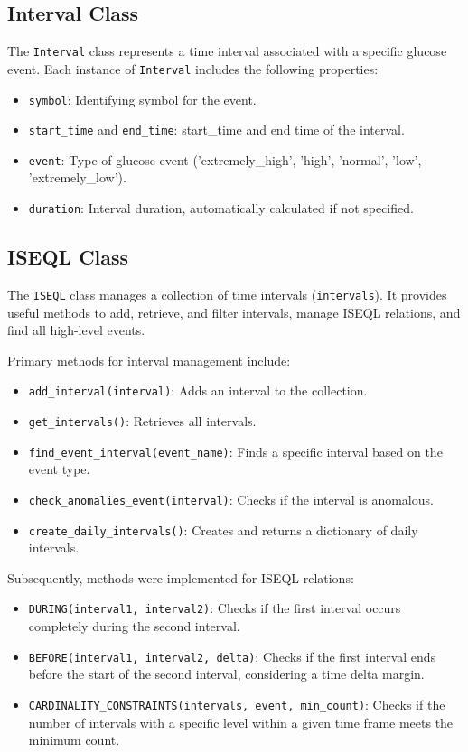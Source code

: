 \documentclass{article}
\begin{document}
\subsection{Interval Class}
The \texttt{Interval} class represents a time interval associated with a specific glucose event. Each instance of \texttt{Interval} includes the following properties:
\begin{itemize}
    \item \texttt{symbol}: Identifying symbol for the event.
    \item \texttt{start\_time} and \texttt{end\_time}: start\_time and end time of the interval.
    \item \texttt{event}: Type of glucose event ('extremely\_high', 'high', 'normal', 'low', 'extremely\_low').
    \item \texttt{duration}: Interval duration, automatically calculated if not specified.
\end{itemize}

\subsection{ISEQL Class}
The \texttt{ISEQL} class manages a collection of time intervals (\texttt{intervals}). It provides useful methods to add, retrieve, and filter intervals, manage ISEQL relations, and find all high-level events.

Primary methods for interval management include:
\begin{itemize}
    \item \texttt{add\_interval(interval)}: Adds an interval to the collection.
    \item \texttt{get\_intervals()}: Retrieves all intervals.
    \item \texttt{find\_event\_interval(event\_name)}: Finds a specific interval based on the event type.
    \item \texttt{check\_anomalies\_event(interval)}: Checks if the interval is anomalous.
    \item \texttt{create\_daily\_intervals()}: Creates and returns a dictionary of daily intervals.
\end{itemize}

Subsequently, methods were implemented for ISEQL relations:
\begin{itemize}

    \item \texttt{DURING(interval1, interval2)}: Checks if the first interval occurs completely during the second interval.
    \item \texttt{BEFORE(interval1, interval2, delta)}: Checks if the first interval ends before the start of the second interval, considering a time delta margin.
    \item \texttt{CARDINALITY\_CONSTRAINTS(intervals, event, min\_count)}: Checks if the number of intervals with a specific level within a given time frame meets the minimum count.
\end{itemize}
\end{document}
